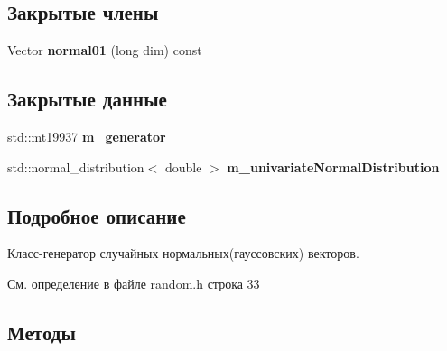 \subsection*{Закрытые члены}
\begin{DoxyCompactItemize}
\item 
Vector {\bfseries normal01} (long dim) const \hypertarget{class_math_1_1_multivariate_normal_distribution_ae698cb99a8950bfe8d4e80ba3f84ed43}{}\label{class_math_1_1_multivariate_normal_distribution_ae698cb99a8950bfe8d4e80ba3f84ed43}

\end{DoxyCompactItemize}
\subsection*{Закрытые данные}
\begin{DoxyCompactItemize}
\item 
std\+::mt19937 {\bfseries m\+\_\+generator}\hypertarget{class_math_1_1_multivariate_normal_distribution_a10b916638bf187caeee4e06ada03a563}{}\label{class_math_1_1_multivariate_normal_distribution_a10b916638bf187caeee4e06ada03a563}

\item 
std\+::normal\+\_\+distribution$<$ double $>$ {\bfseries m\+\_\+univariate\+Normal\+Distribution}\hypertarget{class_math_1_1_multivariate_normal_distribution_a1936e5faaa85d78874ff143c44ee34f5}{}\label{class_math_1_1_multivariate_normal_distribution_a1936e5faaa85d78874ff143c44ee34f5}

\end{DoxyCompactItemize}


\subsection{Подробное описание}
Класс-\/генератор случайных нормальных(гауссовских) векторов. 

См. определение в файле random.\+h строка 33



\subsection{Методы}

